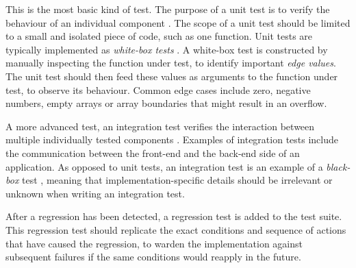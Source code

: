 \begin{enumerate}
	 This is the most basic kind of test. The purpose of a unit test is to verify the behaviour of an individual component \cite{whittaker2000}. The scope of a unit test should be limited to a small and isolated piece of code, such as one function. Unit tests are typically implemented as \emph{white-box tests} \cite[p.~12]{6588537}. A white-box test is constructed by manually inspecting the function under test, to identify important \emph{edge values}. The unit test should then feed these values as arguments to the function under test, to observe its behaviour. Common edge cases include zero, negative numbers, empty arrays or array boundaries that might result in an overflow.
	
	 A more advanced test, an integration test verifies the interaction between multiple individually tested components \cite{whittaker2000}. Examples of integration tests include the communication between the front-end and the back-end side of an application. As opposed to unit tests, an integration test is an example of a \emph{black-box} test \cite[p.~6]{6588537}, meaning that implementation-specific details should be irrelevant or unknown when writing an integration test.
	
	 After a regression has been detected, a regression test \cite[p.~372]{8016712} is added to the test suite. This regression test should replicate the exact conditions and sequence of actions that have caused the regression, to warden the implementation against subsequent failures if the same conditions would reapply in the future.
\end{enumerate}

